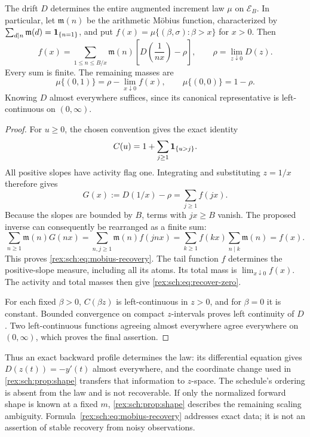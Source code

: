\begin{theorem}
\label{rex:sch:thm:recovery}
The drift $D$ determines the entire augmented increment law $\mu$
on $\mathcal E_B$. In particular, let $\mathfrak m(n)$ be the
arithmetic M\"obius function, characterized by
$\sum_{d\mid n}\mathfrak m(d)=\mathbf 1_{\{n=1\}}$, and put
$f(x)=\mu\{(\beta,\sigma):\beta>x\}$ for $x>0$. Then
\begin{equation}\label{rex:sch:eq:mobius-recovery}
 \boxed{\displaystyle
 f(x)=\sum_{1\leq n\leq B/x}\mathfrak m(n)
 \left[D\!\left(\frac1{nx}\right)-\rho\right],
 \qquad \rho=\lim_{z\downarrow0}D(z).}
\end{equation}
Every sum is finite. The remaining masses are
\begin{equation}\label{rex:sch:eq:recover-zero}
 \mu\{(0,1)\}=\rho-\lim_{x\downarrow0}f(x),
 \qquad \mu\{(0,0)\}=1-\rho.
\end{equation}
Knowing $D$ almost everywhere suffices, since its canonical
representative is left-continuous on $(0,\infty)$.
\end{theorem}

\begin{proof}
For $u\geq0$, the chosen convention gives the exact identity
\[
 C(u)=1+\sum_{j\geq1}\mathbf 1_{\{u>j\}}.
\]
All positive slopes have activity flag one. Integrating and
substituting $z=1/x$ therefore gives
\[
 G(x):=D(1/x)-\rho=\sum_{j\geq1}f(jx).
\]
Because the slopes are bounded by $B$, terms with $jx\geq B$
vanish. The proposed inverse can consequently be rearranged as
a finite sum:
\[
 \sum_{n\geq1}\mathfrak m(n)G(nx)
 =\sum_{n,j\geq1}\mathfrak m(n)f(jnx)
 =\sum_{k\geq1}f(kx)\sum_{n\mid k}\mathfrak m(n)
 =f(x).
\]
This proves \eqref{rex:sch:eq:mobius-recovery}. The tail function $f$
determines the positive-slope measure, including all its atoms.
Its total mass is $\lim_{x\downarrow0}f(x)$. The activity
and total masses then give \eqref{rex:sch:eq:recover-zero}.

For each fixed $\beta>0$, $C(\beta z)$ is left-continuous in
$z>0$, and for $\beta=0$ it is constant. Bounded convergence
on compact $z$-intervals proves left continuity of $D$.
Two left-continuous functions agreeing almost everywhere agree
everywhere on $(0,\infty)$, which proves the final assertion.
\end{proof}

Thus an exact backward profile determines the law: its differential
equation gives $D(z(t))=-y'(t)$ almost everywhere, and the coordinate
change used in \cref{rex:sch:prop:shape} transfers that information to
$z$-space. The schedule's ordering is absent from the law and is
not recoverable. If only the normalized forward shape is known
at a fixed $m$, \cref{rex:sch:prop:shape} describes the remaining scaling
ambiguity. Formula~\eqref{rex:sch:eq:mobius-recovery} addresses exact data;
it is not an assertion of stable recovery from noisy observations.

